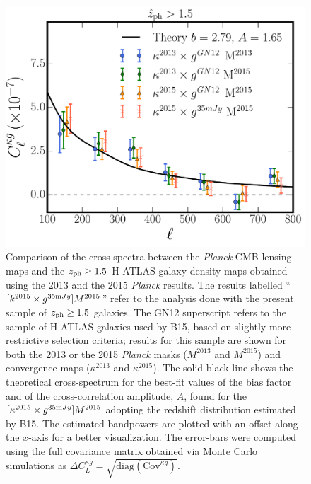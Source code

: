 \begin{figure} %
\centering %
\includegraphics[width=\textwidth]{Chapter4/Images/kg_ALL_2013_2015_z15_10_allcomparisons}
\caption{Comparison of the cross-spectra between the \emph{Planck} CMB lensing maps and the $z_{\rm{ph}} \ge 1.5$ H-ATLAS galaxy density maps obtained using the 2013 and the 2015 \emph{Planck} results. The results labelled ``$[k^{2015}\times g^{35\rm mJy}]M^{2015}$'' refer to the analysis done with the present sample of $z_{\rm{ph}}\ge1.5$ galaxies. The GN12 superscript refers to the sample of H-ATLAS galaxies used by B15, based on slightly more restrictive selection criteria; results for this sample are shown for both the 2013 or the 2015 \emph{Planck} masks ($M^{2013}$ and $M^{2015}$) and convergence maps ($\kappa^{2013}$ and $\kappa^{2015}$). The solid black line shows the theoretical cross-spectrum for the best-fit values of the bias factor and of the cross-correlation amplitude, $A$, found for the $[\kappa^{2015}\times g^{35\rm mJy}]M^{2015}$ adopting the redshift distribution  estimated by B15. The estimated bandpowers are plotted with an offset along the $x$-axis for a better visualization. The error-bars were computed using the full covariance matrix obtained via Monte Carlo simulations as $\Delta C^{\kappa g}_L = \sqrt{\text{diag}(\text{Cov}^{\kappa g})}$.
  \label{fig:kg_data}}
\end{figure}

